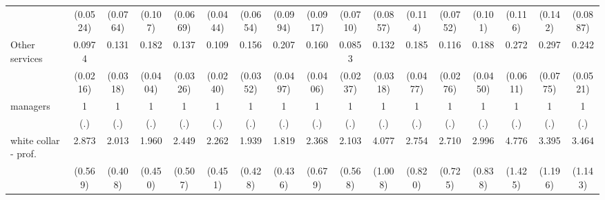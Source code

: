 {\begin{tabular}{l*{16}{c}}
                    &    (0.0524)         &    (0.0764)         &     (0.107)         &    (0.0669)         &    (0.0444)         &    (0.0654)         &    (0.0994)         &    (0.0917)         &    (0.0710)         &    (0.0857)         &     (0.114)         &    (0.0752)         &     (0.101)         &     (0.116)         &     (0.142)         &    (0.0887)         \\
[1em]
Other services      &      0.0974\sym{***}&       0.131\sym{***}&       0.182\sym{***}&       0.137\sym{***}&       0.109\sym{***}&       0.156\sym{***}&       0.207\sym{***}&       0.160\sym{***}&      0.0853\sym{***}&       0.132\sym{***}&       0.185\sym{***}&       0.116\sym{***}&       0.188\sym{***}&       0.272\sym{***}&       0.297\sym{***}&       0.242\sym{***}\\
                    &    (0.0216)         &    (0.0318)         &    (0.0404)         &    (0.0326)         &    (0.0240)         &    (0.0352)         &    (0.0497)         &    (0.0406)         &    (0.0237)         &    (0.0318)         &    (0.0477)         &    (0.0276)         &    (0.0450)         &    (0.0611)         &    (0.0775)         &    (0.0521)         \\
[1em]
managers            &           1         &           1         &           1         &           1         &           1         &           1         &           1         &           1         &           1         &           1         &           1         &           1         &           1         &           1         &           1         &           1         \\
                    &         (.)         &         (.)         &         (.)         &         (.)         &         (.)         &         (.)         &         (.)         &         (.)         &         (.)         &         (.)         &         (.)         &         (.)         &         (.)         &         (.)         &         (.)         &         (.)         \\
[1em]
white collar - prof.&       2.873\sym{***}&       2.013\sym{***}&       1.960\sym{**} &       2.449\sym{***}&       2.262\sym{***}&       1.939\sym{**} &       1.819\sym{*}  &       2.368\sym{**} &       2.103\sym{**} &       4.077\sym{***}&       2.754\sym{***}&       2.710\sym{***}&       2.996\sym{***}&       4.776\sym{***}&       3.395\sym{***}&       3.464\sym{***}\\
                    &     (0.569)         &     (0.408)         &     (0.450)         &     (0.507)         &     (0.451)         &     (0.428)         &     (0.436)         &     (0.679)         &     (0.568)         &     (1.008)         &     (0.820)         &     (0.725)         &     (0.838)         &     (1.425)         &     (1.196)         &     (1.143)         \\

\end{tabular}}
